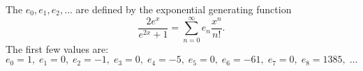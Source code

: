 The  $e_0, e_1, e_2, \ldots$ are defined by the exponential generating function
$$\frac{2e^x}{e^{2x} + 1} = \sum_{n=0}^{\infty} e_n \frac{x^n}{n!}.$$
The first few values are:
$$e_0 = 1,\; e_1 = 0,\; e_2 = -1,\; e_3 = 0,\; e_4 = -5,\; e_5 = 0,\; e_6 = -61,\; e_7 = 0,\; e_8 = 1385,\; \ldots$$

